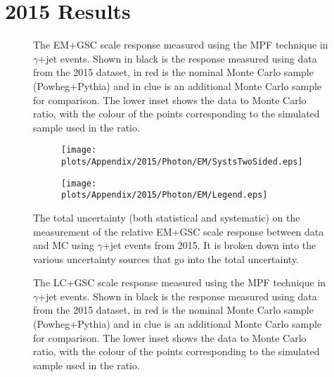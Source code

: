 \chapter{2015 Results}
\label{App:2015}

\begin{figure}[!ht]
  \begin{center}
  \end{center}
  \caption[EM scale response using $\gamma$+jet in 2015]
  {\small The EM+GSC scale response measured using the MPF technique in $\gamma$+jet events.  Shown in black is the response measured using data from the 2015 dataset, in red is the nominal Monte Carlo sample (Powheg+Pythia) and in clue is an additional Monte Carlo sample for comparison.  The lower inset shows the data to Monte Carlo ratio, with the colour of the points corresponding to the simulated sample used in the ratio.  }
  \label{plot:GammaJetEM2015App}
\end{figure}


\begin{figure}[!ht]
\captionsetup[subfigure]{labelformat=empty}
 \begin{center}
   \begin{subfigure}{0.55\textwidth}
     \hspace{-3cm}
     \texttt{[image: plots/Appendix/2015/Photon/EM/SystsTwoSided.eps]}
   \end{subfigure}
   \begin{subfigure}{0.55\textwidth}
     \hspace{-3cm}
     \texttt{[image: plots/Appendix/2015/Photon/EM/Legend.eps]}
   \end{subfigure}
 \end{center}
 \caption[Uncertainty on the EM+GSC scale response measurement using $\gamma$+jet]
 {\small The total uncertainty (both statistical and systematic) on the measurement of the relative EM+GSC scale response between data and MC using $\gamma$+jet events from 2015.  It is broken down into the various uncertainty sources that go into the total uncertainty.  }
 \label{Fig:GammaJetSystsEM2015}
\end{figure}

\begin{figure}[!ht]
  \begin{center}
  \end{center}
  \caption[LC scale response using $\gamma$+jet in 2015]
  {\small The LC+GSC scale response measured using the MPF technique in $\gamma$+jet events.  Shown in black is the response measured using data from the 2015 dataset, in red is the nominal Monte Carlo sample (Powheg+Pythia) and in clue is an additional Monte Carlo sample for comparison.  The lower inset shows the data to Monte Carlo ratio, with the colour of the points corresponding to the simulated sample used in the ratio.  }
  \label{plot:GammaJetLC2015App}
\end{figure}


